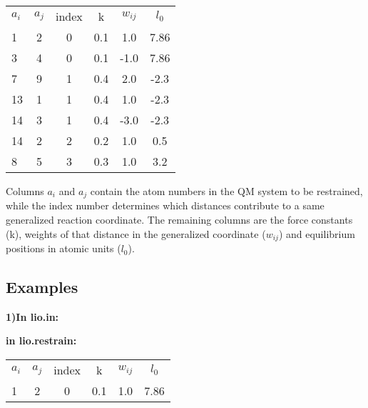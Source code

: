 \documentclass[journal=jctcce,manuscript=article]{achemso}
\begin{document}
    \begin{table}  [H]
      \begin{center}
      \begin{tabular}{ l c c c c c}
         $a_i$ & $a_j$ & index &   k  &    $w_{ij}$   &  $l_0$    \\
         1  &  2 &   0   &  0.1 &    1.0   & 7.86   \\
         3  &  4 &   0   &  0.1 &   -1.0   & 7.86   \\
         7  &  9 &   1   &  0.4 &    2.0   & -2.3   \\
         13 &  1 &   1   &  0.4 &    1.0   & -2.3   \\
         14 &  3 &   1   &  0.4 &   -3.0   & -2.3   \\
         14 &  2 &   2   &  0.2 &    1.0   & 0.5    \\
         8  &  5 &   3   &  0.3 &    1.0   & 3.2    \\
       \end{tabular}
       \end{center}
      \label{lio.restrain}
    \end{table}

Columns $a_i$ and $a_j$ contain the atom numbers in the QM system to be restrained, while the index number determines which distances contribute to a same generalized reaction coordinate. The remaining columns are the force constants (k), weights of that distance in the generalized coordinate ($w_{ij}$) and equilibrium positions in atomic units ($l_0$).

    \subsection{Examples}

    \textbf{1)In lio.in:}
    
        \textbf{in lio.restrain:}

    \begin{table}  [H]
      \begin{center}
      \begin{tabular}{ l c c c c c}
         $a_i$ & $a_j$ & index &   k  &    $w_{ij}$   &  $l_0$   \\
         1  &  2 &   0   &  0.1 &    1.0   & 7.86   \\
       \end{tabular}
       \end{center}
      \label{Tex1}
    \end{table}
\end{document}
